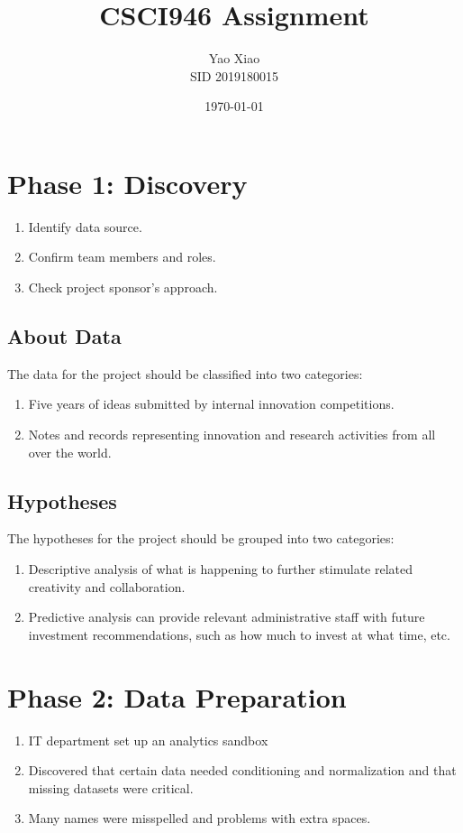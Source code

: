 \documentclass{article}
\title{CSCI946 Assignment}
\author{Yao Xiao \\ SID 2019180015}
\date{\today}
\begin{document}
\maketitle

\section{Phase 1: Discovery}
\begin{enumerate}
    \item Identify data source.
    \item Confirm team members and roles.
    \item Check project sponsor's approach.
\end{enumerate}

\subsection{About Data}
The data for the project should be classified into two categories:
\begin{enumerate}
    \item Five years of ideas submitted by internal innovation competitions.
    \item Notes and records representing innovation and research activities from all over the world.
\end{enumerate}

\subsection{Hypotheses}
The hypotheses for the project should be grouped into two categories:
\begin{enumerate}
    \item Descriptive analysis of what is happening to further stimulate related creativity and collaboration.
    \item Predictive analysis can provide relevant administrative staff with future investment recommendations, such as how much to invest at what time, etc.
\end{enumerate}

\section{Phase 2: Data Preparation}
\begin{enumerate}
    \item IT department set up an analytics sandbox
    \item Discovered that certain data needed conditioning and normalization and that missing datasets were critical.
    \item Many names were misspelled and problems with extra spaces.
\end{enumerate}
\end{document}
